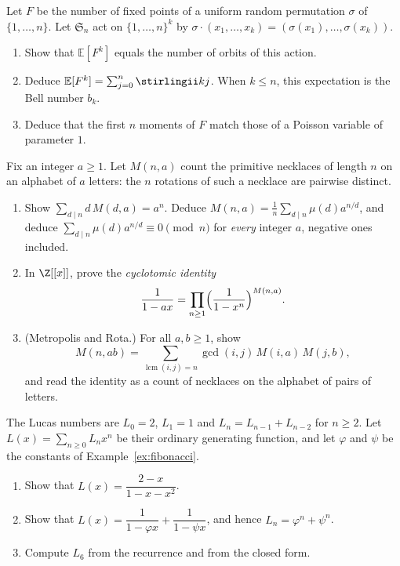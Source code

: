 \begin{exercise}[$\star\star$]\label{pb:fixmoments}
Let $F$ be the number of fixed points of a uniform random permutation $\sigma$ of $\{1,\dots,n\}$. Let $\mathfrak S_n$
act on $\{1,\dots,n\}^k$ by $\sigma\cdot(x_1,\dots,x_k)=(\sigma(x_1),\dots,\sigma(x_k))$.
\begin{enumerate}[label=(\alph*)]
\item Show that $\mathbb E[F^k]$ equals the number of orbits of this action.
\item Deduce $\mathbb E[F^k]=\sum_{j=0}^n\stirlingii kj$. When $k\le n$, this expectation is the Bell number $b_k$.
\item Deduce that the first $n$ moments of $F$ match those of a Poisson variable of parameter $1$.
\end{enumerate}
\end{exercise}

\begin{exercise}[$\star\star$]\label{pb:necklacering}
Fix an integer $a\ge1$. Let $M(n,a)$ count the primitive necklaces of length $n$ on an alphabet of $a$ letters:
the $n$ rotations of such a necklace are pairwise distinct.
\begin{enumerate}[label=(\alph*)]
\item Show $\sum_{d\mid n}d\,M(d,a)=a^n$. Deduce $M(n,a)=\frac1n\sum_{d\mid n}\mu(d)a^{n/d}$, and deduce
$\sum_{d\mid n}\mu(d)a^{n/d}\equiv0\pmod n$ for \emph{every} integer $a$, negative ones included.
\item In $\Z[[x]]$, prove the \emph{cyclotomic identity}
\[
\frac1{1-ax}=\prod_{n\ge1}\Bigl(\frac1{1-x^n}\Bigr)^{M(n,a)}.
\]
\item (Metropolis and Rota.) For all $a,b\ge1$, show
\[
M(n,ab)=\sum_{\operatorname{lcm}(i,j)=n}\gcd(i,j)\,M(i,a)\,M(j,b),
\]
and read the identity as a count of necklaces on the alphabet of pairs of letters.
\end{enumerate}
\end{exercise}

\begin{exercise}[$\star$]\label{ex:rw02a}
The Lucas numbers are $L_0=2$, $L_1=1$ and $L_n=L_{n-1}+L_{n-2}$ for $n\ge2$. Let $L(x)=\sum_{n\ge0}L_nx^n$ be their ordinary generating function, and let $\varphi$ and $\psi$ be the constants of Example~\ref{ex:fibonacci}.
\begin{enumerate}[label=(\alph*)]
\item Show that $L(x)=\dfrac{2-x}{1-x-x^2}$.
\item Show that $L(x)=\dfrac{1}{1-\varphi x}+\dfrac{1}{1-\psi x}$, and hence $L_n=\varphi^n+\psi^n$.
\item Compute $L_6$ from the recurrence and from the closed form.
\end{enumerate}
\end{exercise}

